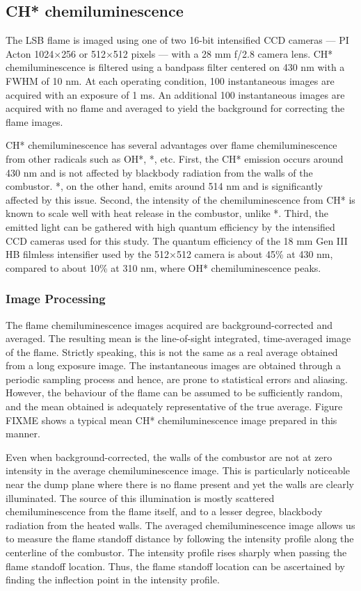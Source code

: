 \subsection{CH* chemiluminescence}

The LSB flame is imaged using one of two 16-bit intensified CCD cameras --- PI Acton 1024\(\times\)256 or 512\(\times\)512 pixels --- with a 28 mm f/2.8 camera lens.
CH* chemiluminescence is filtered using a bandpass filter centered on 430 nm with a FWHM of 10 nm.
At each operating condition, 100 instantaneous images are acquired with an exposure of 1 ms.
An additional 100 instantaneous images are acquired with no flame and averaged to yield the background for correcting the flame images.

CH* chemiluminescence has several advantages over flame chemiluminescence from other radicals such as OH*, *, etc.
First, the CH* emission occurs around 430 nm and is not affected by blackbody radiation from the walls of the combustor.
*, on the other hand, emits around 514 nm and is significantly affected by this issue.
Second, the intensity of the chemiluminescence from CH* is known to scale well with heat release in the combustor\cite{2006-hardalupas}, unlike *.
Third, the emitted light can be gathered with high quantum efficiency by the intensified CCD cameras used for this study.
The quantum efficiency of the 18 mm Gen III HB filmless intensifier used by the 512\(\times\)512 camera is about 45\% at 430 nm, compared to about 10\% at 310 nm, where OH* chemiluminescence peaks.

\subsubsection{Image Processing}

The flame chemiluminescence images acquired are background-corrected and averaged.
The resulting mean is the line-of-sight integrated, time-averaged image of the flame.
Strictly speaking, this is not the same as a real average obtained from a long exposure image.
The instantaneous images are obtained through a periodic sampling process and hence, are prone to statistical errors and aliasing.
However, the behaviour of the flame can be assumed to be sufficiently random, and the mean obtained is adequately representative of the true average.
Figure FIXME shows a typical mean CH* chemiluminescence image prepared in this manner.

Even when background-corrected, the walls of the combustor are not at zero intensity in the average chemiluminescence image.
This is particularly noticeable near the dump plane where there is no flame present and yet the walls are clearly illuminated.
The source of this illumination is mostly scattered chemiluminescence from the flame itself, and to a lesser degree, blackbody radiation from the heated walls.
The averaged chemiluminescence image allows us to measure the flame standoff distance by following the intensity profile along the centerline of the combustor.
The intensity profile rises sharply when passing the flame standoff location.
Thus, the flame standoff location can be ascertained by finding the inflection point in the intensity profile.

